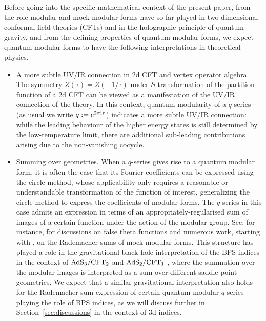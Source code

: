 \documentclass[pdftex]{sigma}
\theoremstyle{definition}
\numberwithin{equation}{section}
\begin{document}
Before going into the specific mathematical context of the present paper, from the role modular and mock modular forms have so far played in two-dimensional conformal field theories (CFTs) and in the holographic principle of quantum gravity, and from the defining properties of quantum modular forms, we expect quantum modular forms to have the following interpretations in theoretical physics.
 \begin{itemize}\itemsep=0pt
\item{A more subtle UV/IR connection in 2d CFT and vertex operator algebra. }
The symmetry $Z(\tau)=Z(-1/\tau)$ under $S$-transformation of the partition function of a 2d CFT can be viewed as a manifestation of the UV/IR connection of the theory. In this context, quantum modularity of a $q$-series \big(as usual we write $q:={\rm e}^{2\pi {\rm i} \tau}$\big) indicates a more subtle UV/IR connection: while the leading behaviour of the higher energy states is still determined by the low-temperature limit, there are additional sub-leading contributions arising due to the non-vanishing cocycle.
\item{Summing over geometries.} When a $q$-series gives rise to a quantum modular form, it is often the case that its Fourier coefficients can be expressed using the circle method, whose applicability only requires a reasonable or understandable transformation of the function of interest, generalizing the circle method to express the coefficients of modular forms.
The $q$-series in this case admits an expression in terms of an appropriately-regularised sum of images of a certain function under the action of the modular group. See, for instance, \cite{Bringmann:2021wuk, Bringmann:2019vyd, Cheng:2012qc} for discussions on false theta functions and numerous work, starting with \cite{10.2307/1997003},
on the Rademacher sums of mock modular forms.
This structure has played a role in the gravitational black hole interpretation of the BPS indices in the context of ${\rm AdS}_3/{\rm CFT}_2$ \cite{deBoer:2006vg, Denef:2007vg,Dijkgraaf:2000fq,Maldacena:1998bw} and ${\rm AdS}_2/{\rm CFT}_1$ \cite{Dabholkar:2014ema, Ferrari:2017msn,Murthy:2009dq}, where the summation over the modular images is interpreted as a sum over different saddle point geometries.
We expect that a similar gravitational interpretation also holds for the Rademacher sum expression of certain quantum modular $q$-series playing the role of BPS indices, as we will discuss further in Section~\ref{sec:discussions} in the context of 3d indices.
\end{itemize}
\end{document}
